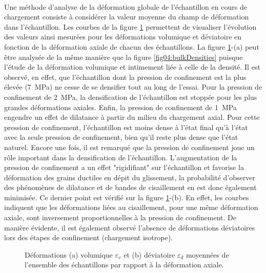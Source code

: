 		\paragraph{}
		Une méthode d'analyse de la déformation globale de l'échantillon en cours de chargement consiste à considérer la valeur moyenne du champ de déformation dans l'échantillon. Les courbes de la figure \ref{fig04:global_defo_vol_dev} permettent de visualiser l'évolution des valeurs ainsi mesurées pour les déformations volumique et déviatoire en fonction de la déformation axiale de chacun des échantillons. La figure \ref{fig04:global_defo_vol_dev}-(a) peut être analysée de la même manière que la figure \ref{fig04:bulkDensities} puisque l'étude de la déformation volumique et intimement liée à celle de la densité. Il est observé, en effet, que l'échantillon dont la pression de confinement est la plus élevée (\SI{7}{\mega\pascal}) ne cesse de se densifier tout au long de l'essai. Pour la pression de confinement de \SI{2}{\mega\pascal}, la densification de l'échantillon est stoppée pour les plus grandes déformations axiales. Enfin, la pression de confinement de \SI{1}{\mega\pascal} engendre un effet de dilatance à partir du milieu du chargement axial. Pour cette pression de confinement, l'échantillon est moins dense à l'état final qu'à l'état avec la seule pression de confinement, bien qu'il reste plus dense que l'état naturel. Encore une fois, il est remarqué que la pression de confinement joue un rôle important dans la densification de l'échantillon. L'augmentation de la pression de confinement a un effet "rigidifiant" sur l'échantillon et favorise la déformation des grains ductiles en dépit du glissement, la probabilité d'observer des phénomènes de dilatance et de bandes de cisaillement en est donc également minimisée.
		Ce dernier point est vérifié sur la figure \ref{fig04:global_defo_vol_dev}-(b). En effet, les courbes indiquent que les déformations liées au cisaillement, pour une même déformation axiale, sont inversement proportionnelles à la pression de confinement. De manière évidente, il est également observé l'absence de déformations déviatoires lors des étapes de confinement (chargement isotrope).
		\begin{figure}\centering
			\hfill
			\caption{\label{fig04:global_defo_vol_dev}Déformations (a) volumique $\varepsilon_v$ et (b) déviatoire $\varepsilon_d$ moyennées de l'ensemble des échantillons par rapport à la déformation axiale.}
		\end{figure}
